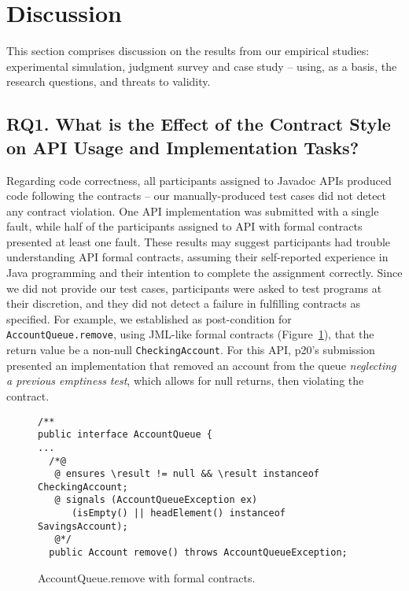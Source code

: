 \section{Discussion}
\label{sec:discussion}

This section comprises discussion on the results from our empirical studies: experimental simulation, judgment survey and case study -- using, as a basis, the research questions, and threats to validity.


\subsection{RQ1. What is the Effect of the Contract Style on API Usage and Implementation Tasks?}
\label{rq1}

Regarding code correctness, all participants assigned to Javadoc APIs produced code
following the contracts -- our manually-produced test cases did not detect any contract violation. One \contractjdoc{} API implementation was submitted with a single fault, while half of the participants assigned to API with formal contracts presented at least one fault.
These results may suggest participants had trouble understanding API formal contracts, assuming their self-reported experience in Java programming and their intention to complete the assignment correctly.
Since we did not provide our test cases, participants were asked to test programs at their discretion, and they did not detect a failure in fulfilling contracts as specified.
For example, we established as post-condition for \texttt{AccountQueue.remove}, using JML-like formal contracts (Figure~\ref{code:remove}), that the return value be a non-null \texttt{CheckingAccount}. For this API, p20's submission presented an implementation that removed an account from the queue \emph{neglecting a previous emptiness test}, which allows for null returns, then violating the contract.


\begin{figure}
\centering
\begin{lstlisting}[basicstyle=\footnotesize\ttfamily,name=figxpi, frame=lines, mathescape=true]
/**
public interface AccountQueue {
...
  /*@
   @ ensures \result != null && \result instanceof CheckingAccount;
   @ signals (AccountQueueException ex) 
      (isEmpty() || headElement() instanceof SavingsAccount);
   @*/
  public Account remove() throws AccountQueueException;

\end{lstlisting}
\caption{AccountQueue.remove with formal contracts.}
\label{code:remove}
\end{figure}


